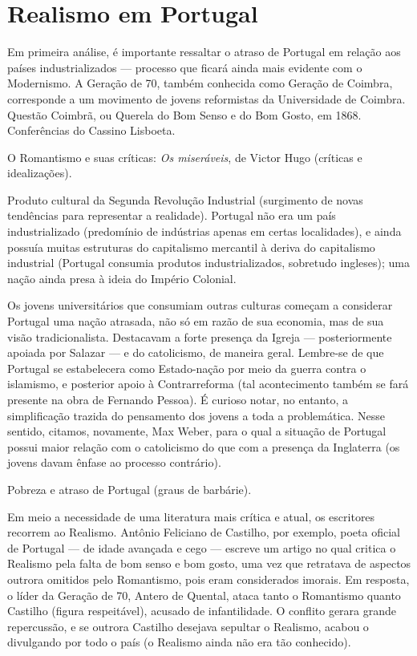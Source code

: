 
\chapter{Realismo em Portugal}

Em primeira análise, é importante ressaltar o atraso de Portugal em relação aos países industrializados — processo que ficará ainda mais evidente com o Modernismo. A Geração de 70, também conhecida como Geração de Coimbra, corresponde a um movimento de jovens reformistas da Universidade de Coimbra. Questão Coimbrã, ou Querela do Bom Senso e do Bom Gosto, em 1868. Conferências do Cassino Lisboeta.

O Romantismo e suas críticas: \textit{Os miseráveis}, de Victor Hugo (críticas e idealizações).

Produto cultural da Segunda Revolução Industrial (surgimento de novas tendências para representar a realidade). Portugal não era um país industrializado (predomínio de indústrias apenas em certas localidades), e ainda possuía muitas estruturas do capitalismo mercantil à deriva do capitalismo industrial (Portugal consumia produtos industrializados, sobretudo ingleses); uma nação ainda presa à ideia do Império Colonial.

Os jovens universitários que consumiam outras culturas começam a considerar Portugal uma nação atrasada, não só em razão de sua economia, mas de sua visão tradicionalista. Destacavam a forte presença da Igreja — posteriormente apoiada por Salazar — e do catolicismo, de maneira geral. Lembre-se de que Portugal se estabelecera como Estado-nação por meio da guerra contra o islamismo, e posterior apoio à Contrarreforma (tal acontecimento também se fará presente na obra de Fernando Pessoa). É curioso notar, no entanto, a simplificação trazida do pensamento dos jovens a toda a problemática. Nesse sentido, citamos, novamente, Max Weber, para o qual a situação de Portugal possui maior relação com o catolicismo do que com a presença da Inglaterra (os jovens davam ênfase ao processo contrário).

Pobreza e atraso de Portugal (graus de barbárie).

Em meio a necessidade de uma literatura mais crítica e atual, os escritores recorrem ao Realismo. Antônio Feliciano de Castilho, por exemplo, poeta oficial de Portugal — de idade avançada e cego — escreve um artigo no qual critica o Realismo pela falta de bom senso e bom gosto, uma vez que retratava de aspectos outrora omitidos pelo Romantismo, pois eram considerados imorais. Em resposta, o líder da Geração de 70, Antero de Quental, ataca tanto o Romantismo quanto Castilho (figura respeitável), acusado de infantilidade. O conflito gerara grande repercussão, e se outrora Castilho desejava sepultar o Realismo, acabou o divulgando por todo o país (o Realismo ainda não era tão conhecido).


